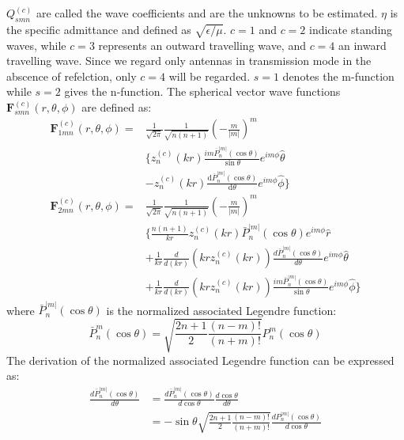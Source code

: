 \documentclass{article}
\begin{document}
\(Q_{smn}^{(c)}\) are called the wave coefficients and are the unknowns to be estimated. \(\eta\) is the specific admittance and defined as \(\sqrt{\epsilon/\mu}\). \(c = 1\) and \(c = 2\) indicate standing waves, while \(c = 3\) represents an outward travelling wave, and \(c = 4\) an inward travelling wave. Since we regard only antennas in transmission mode in the abscence of refelction, only \(c=4\) will be regarded. \(s = 1\) denotes the m-function while \(s = 2\) gives the n-function. The spherical vector wave functions \(\mathbf{F}_{smn}^{(c)}(r,\theta,\phi)\) are defined as:
\begin{equation}
    \begin{split}
        \mathbf{F}_{1mn}^{(c)}(r,\theta,\phi) = &\frac{1}{\sqrt{2 \pi}} \frac{1}{\sqrt{n(n+1)}} \left( -\frac{m}{|m|} \right)^m \\
        &\Bigg\{ z_n^{(c)}(kr) \frac{i m \overline{P}_n^{|m|}(\cos \theta)}{\sin \theta} e^{i m \phi} \hat{\theta} \\
        &- z_n^{(c)}(kr) \frac{\mathrm{d} \overline{P}_n^{|m|}(\cos \theta)}{\mathrm{d} \theta} e^{i m \phi} \hat{\phi} \Bigg\} \\
        \mathbf{F}_{2mn}^{(c)}(r, \theta, \phi) = &\frac{1}{\sqrt{2\pi}} \frac{1}{\sqrt{n(n+1)}} \left( -\frac{m}{|m|} \right)^m \\
        &\Bigg\{ \frac{n(n+1)}{kr} z_n^{(c)}(kr) \bar{P}_n^{|m|}(\cos \theta) e^{im\phi} \hat{r} \\
        &+ \frac{1}{kr} \frac{d}{d(kr)} \left( kr z_n^{(c)}(kr) \right) \frac{d \bar{P}_n^{|m|}(\cos \theta)}{d\theta} e^{im\phi} \hat{\theta} \\
        &+ \frac{1}{kr} \frac{d}{d(kr)} \left( kr z_n^{(c)}(kr) \right) \frac{im \bar{P}_n^{|m|}(\cos \theta)}{\sin \theta} e^{im\phi} \hat{\phi} \Bigg\}
    \end{split}
\end{equation}
where \(\bar{P}_n^{|m|}(\cos \theta)\) is the normalized associated Legendre function:
\begin{equation}
    \bar{P}_n^m(\cos \theta) = \sqrt{\frac{2n+1}{2} \frac{(n-m)!}{(n+m)!}} P_n^m(\cos \theta)
\end{equation}
The derivation of the normalized associated Legendre function can be expressed as:
\begin{equation}
    \begin{split}
        \frac{d \bar{P}_n^{|m|}(\cos \theta)}{d\theta} &= \frac{d \bar{P}_n^{|m|}(\cos \theta)}{d\cos \theta} \frac{d\cos \theta}{d\theta} \\
        &= -\sin\theta \sqrt{\frac{2n+1}{2} \frac{(n-m)!}{(n+m)!}} \frac{dP_n^{|m|}(\cos \theta)}{d\cos \theta}
    \end{split}
\end{equation}
\end{document}
